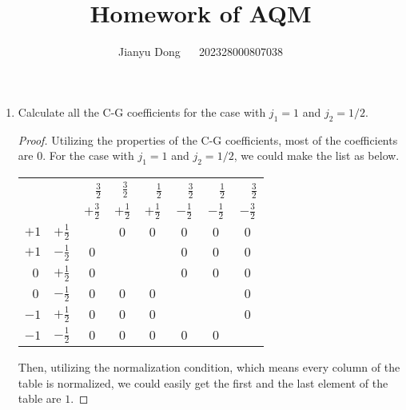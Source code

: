 \documentclass[reqno,a4paper,12pt]{amsart}
\title{Homework of AQM}
\author{Jianyu Dong ~~ 202328000807038}
\begin{document}
\maketitle

\begin{enumerate}[1.]

\item Calculate all the C-G coefficients for the case with $j_1=1$ and $j_2=1/2$.

\begin{proof}
	Utilizing the properties of the C-G coefficients, most of the coefficients are 0. For the case with $j_1 = 1$ and $j_2 = 1/2$, we could make the list as below.
	\begin{table}[!ht]
	\centering
	\begin{tabular}{|cc|c|cc|cc|c|}
	\hline
	\multicolumn{2}{|c|}{\multirow{2}{*}{ }} &\ \ $\frac{3}{2}$ & $\ \ \frac{3}{2}$ &\ \ $\frac{1}{2}$ &\ \ $\frac{3}{2}$ &\ \ $\frac{1}{2}$ &\ \ $\frac{3}{2}$ \\ %
	 & & $+\frac{3}{2}$ & $+\frac{1}{2}$ & $+\frac{1}{2}$ & $-\frac{1}{2}$ & $-\frac{1}{2}$ & $-\frac{3}{2}$ \\
	\hline
	$+1$ & $+\frac{1}{2}$ & & $0$ & $0$ & $0$ & $0$ & $0$ \\
	\hline
	$+1$ & $-\frac{1}{2}$ & $0$ & & & $0$ & $0$ & $0$ \\
	$\ \ 0$ & $+\frac{1}{2}$ & $0$ & & & $0$ & $0$ & $0$ \\
	\hline
	$\ \ 0$ & $-\frac{1}{2}$ & $0$ & $0$ & $0$ & & & $0$ \\
	$-1$ & $+\frac{1}{2}$ & $0$ & $0$ & $0$ & & & $0$ \\  
	\hline
	$-1$ & $-\frac{1}{2}$ & $0$ & $0$ & $0$ & $0$ & $0$ & \\
	\hline
	\end{tabular}
	\end{table}
	
	Then, utilizing the normalization condition, which means every column of the table is normalized, we could easily get the first and the last element of the table are $1$.
	

\end{proof}
\end{enumerate}
\end{document}
